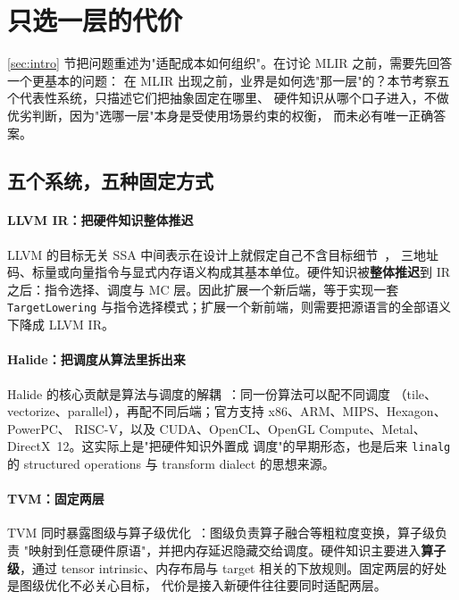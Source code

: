 
\section{只选一层的代价}
\label{sec:background}

\ref{sec:intro} 节把问题重述为"适配成本如何组织"。在讨论 MLIR 之前，需要先回答一个更基本的问题：
在 MLIR 出现之前，业界是如何选"那一层"的？本节考察五个代表性系统，只描述它们把抽象固定在哪里、
硬件知识从哪个口子进入，不做优劣判断，因为"选哪一层"本身是受使用场景约束的权衡，
而未必有唯一正确答案。

\subsection{五个系统，五种固定方式}

\paragraph{LLVM IR：把硬件知识整体推迟}
LLVM 的目标无关 SSA 中间表示在设计上就假定自己不含目标细节~\cite{llvm04}，
三地址码、标量或向量指令与显式内存语义构成其基本单位。硬件知识被\textbf{整体推迟}到 IR 之后：指令选择、调度与 MC 层。因此扩展一个新后端，等于实现一套
\texttt{TargetLowering} 与指令选择模式；扩展一个新前端，则需要把源语言的全部语义下降成 LLVM IR。

\paragraph{Halide：把调度从算法里拆出来}
Halide 的核心贡献是算法与调度的解耦~\cite{halide12,halide13}：同一份算法可以配不同调度
（tile、vectorize、parallel），再配不同后端；官方支持 x86、ARM、MIPS、Hexagon、PowerPC、
RISC-V，以及 CUDA、OpenCL、OpenGL Compute、Metal、DirectX~12。这实际上是"把硬件知识外置成
调度"的早期形态，也是后来 \texttt{linalg} 的 structured operations 与 transform dialect 的思想来源。

\paragraph{TVM：固定两层}
TVM 同时暴露图级与算子级优化~\cite{tvm18}：图级负责算子融合等粗粒度变换，算子级负责
"映射到任意硬件原语"，并把内存延迟隐藏交给调度。硬件知识主要进入\textbf{算子级}，通过
tensor intrinsic、内存布局与 target 相关的下放规则。固定两层的好处是图级优化不必关心目标，
代价是接入新硬件往往要同时适配两层。

